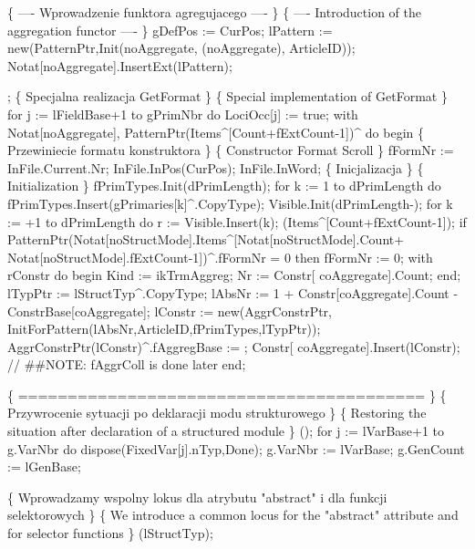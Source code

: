    \{ ---- Wprowadzenie funktora agregujacego ---- \}
   \{ ---- Introduction of the aggregation functor ---- \}
   gDefPos := CurPos;
   lPattern := new(PatternPtr,Init(noAggregate, (noAggregate),
                                   ArticleID));
   Notat[noAggregate].InsertExt(lPattern);
   
   ;
   \{ Specjalna realizacja GetFormat \}
   \{ Special implementation of GetFormat \}
   for j := lFieldBase+1 to gPrimNbr do LociOcc[j] := true;
   with Notat[noAggregate], PatternPtr(Items^[Count+fExtCount-1])^ do
   begin
      \{ Przewiniecie formatu konstruktora \}
      \{ Constructor Format Scroll \}
      fFormNr := InFile.Current.Nr; InFile.InPos(CurPos); InFile.InWord;
      \{ Inicjalizacja \} \{ Initialization \}
      fPrimTypes.Init(dPrimLength);
      for k := 1 to dPrimLength do
         fPrimTypes.Insert(gPrimaries[k]^.CopyType);
      Visible.Init(dPrimLength-);
      for k := +1 to dPrimLength do r := Visible.Insert(k);
      (Items^[Count+fExtCount-1]);
      if PatternPtr(Notat[noStructMode].Items^[Notat[noStructMode].Count+
                                                  Notat[noStructMode].fExtCount-1])^.fFormNr = 0 then
         fFormNr := 0;
      with rConstr do
      begin Kind := ikTrmAggreg; Nr :=  Constr[ coAggregate].Count; end;
      lTypPtr := lStructTyp^.CopyType;
      lAbsNr :=  1 + Constr[coAggregate].Count - ConstrBase[coAggregate];
      lConstr :=  new(AggrConstrPtr,
                      InitForPattern(lAbsNr,ArticleID,fPrimTypes,lTypPtr));
      AggrConstrPtr(lConstr)^.fAggregBase :=  ;
      Constr[ coAggregate].Insert(lConstr);
      // ##NOTE: fAggrColl is done later
   end;
   
   \{ ========================================= \}
   \{ Przywrocenie sytuacji po deklaracji modu strukturowego \}
   \{ Restoring the situation after declaration of a structured module \}
   ();
   for j := lVarBase+1 to g.VarNbr do dispose(FixedVar[j].nTyp,Done);
   g.VarNbr := lVarBase; g.GenCount := lGenBase;
   
   \{ Wprowadzamy wspolny lokus dla atrybutu "abstract"
     i dla funkcji selektorowych \}
   \{ We introduce a common locus for the "abstract"
     attribute and for selector functions \}
   (lStructTyp);
   
